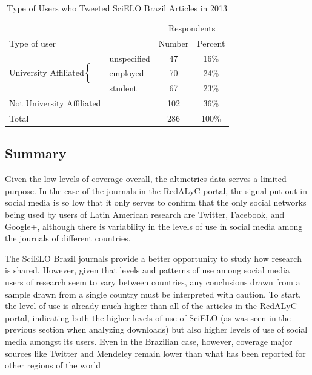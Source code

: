 \begin{table}[!htbp]
\centering
\caption{Type of Users who Tweeted SciELO Brazil Articles in 2013} \label{twitter_users_scielo_br_2013}
\begin{tabular}{@{}llcc@{}}
\toprule
                                        &               & \multicolumn{2}{c}{Respondents}                          \\
\multicolumn{2}{l}{Type of user}      & \multicolumn{1}{c}{Number} & \multicolumn{1}{c}{Percent} \\ \midrule
\multirow{3}{*}{University Affiliated$\left\{\vphantom{\begin{tabular}{c}3\\3\end{tabular}}\right.$}    & unspecified & 47                         & 16\%                        \\
                                        & employed    & 70                         & 24\%                        \\
                                        & student     & 67                         & 23\%                        \\
Not University Affiliated   &                       & 102                         & 36\%                        \\ \midrule
\multicolumn{2}{l}{Total}                               & 286                        & 100\%                      \\ \bottomrule
\end{tabular}
\end{table}


\subsection{Summary}
\label{summary}

Given the low levels of coverage overall, the altmetrics data serves a limited purpose. In the case of the journals in the RedALyC portal, the signal put out in social media is so low that it only serves to confirm that the only social networks being used by users of Latin American research are Twitter, Facebook, and Google+, although there is variability in the levels of use in social media among the journals of different countries.

The SciELO Brazil journals provide a better opportunity to study how research is shared. However, given that levels and patterns of use among social media users of research seem to vary between countries, any conclusions drawn from a sample drawn from a single country must be interpreted with caution. To start, the level of use is already much higher than all of the articles in the RedALyC portal, indicating both the higher levels of use of SciELO (as was seen in the previous section when analyzing downloads) but also higher levels of use of social media amongst its users. Even in the Brazilian case, however, coverage major sources like Twitter and Mendeley remain lower than what has been reported for other regions of the world ~\citep{Bar-ilan2014,Hammarfelt2014,Haustein2014a,Li2012a,Priem2012,Zahedi2014a}

